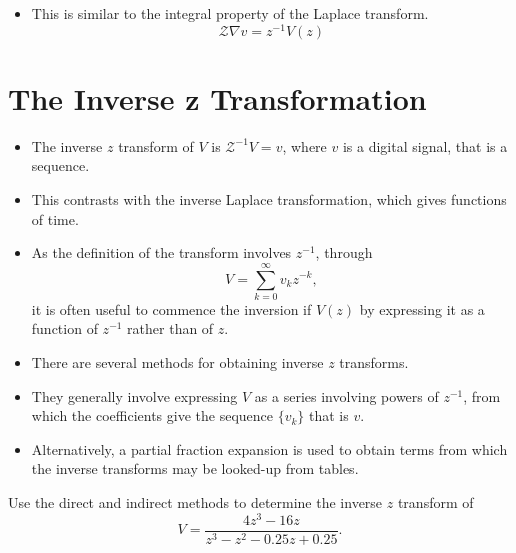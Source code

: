 \begin{slide}\label{slide:l8s3}
\begin{itemize}
\item  This is similar to the integral property of the Laplace
   transform.
  \[\mathcal{Z}\nabla v = z^{-1} V(z)\]
\end{itemize}

\end{slide}

\section*{The Inverse z Transformation}
\begin{slide}\label{slide:l8s4}
   \begin{itemize}
   \item The inverse $z$ transform of $V$ is $\mathcal{Z}^{-1} V = v$,
     where $v$ is a digital signal, that is a sequence.
   \item This contrasts with the inverse Laplace transformation, which
     gives functions of time.
   \item As the definition of the transform involves $z^{-1}$, through
     \[V=\sum_{k=0}^{\infty} v_k z^{-k},\] it is often useful to
     commence the inversion if $V(z)$ by expressing it as a function of
     $z^{-1}$ rather than of $z$.
   \end{itemize}
\end{slide}

\begin{slide}\label{slide:l8s5}
   \begin{itemize}
   \item There are several methods for obtaining inverse $z$
     transforms.
   \item They generally involve expressing $V$ as a series involving
     powers of $z^{-1}$, from which the coefficients give the sequence
     $\{v_k\}$ that is $v$.
   \item Alternatively, a partial fraction expansion is used to obtain
     terms from which the inverse transforms may be looked-up from tables.
   \end{itemize}
\end{slide}

\begin{slide}
Use the direct and indirect methods to determine the inverse $z$ transform of
\[V=\frac{4z^3 - 16z}{z^3 - z^2 -
  0.25 z + 0.25}.\]
\end{slide}

